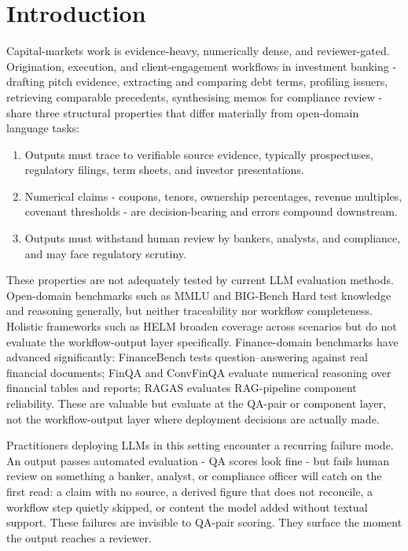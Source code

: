 \documentclass[11pt]{article}
\begin{document}
\section{Introduction}
\label{sec:intro}

Capital-markets work is evidence-heavy, numerically dense, and reviewer-gated. Origination, execution, and client-engagement workflows in investment banking - drafting pitch evidence, extracting and comparing debt terms, profiling issuers, retrieving comparable precedents, synthesising memos for compliance review - share three structural properties that differ materially from open-domain language tasks:

\begin{enumerate}[leftmargin=*,itemsep=0.2em]
\item Outputs must trace to verifiable source evidence, typically prospectuses, regulatory filings, term sheets, and investor presentations.
\item Numerical claims - coupons, tenors, ownership percentages, revenue multiples, covenant thresholds - are decision-bearing and errors compound downstream.
\item Outputs must withstand human review by bankers, analysts, and compliance, and may face regulatory scrutiny.
\end{enumerate}

These properties are not adequately tested by current LLM evaluation methods. Open-domain benchmarks such as MMLU \citep{hendrycks2021mmlu} and BIG-Bench Hard \citep{suzgun2022bbh} test knowledge and reasoning generally, but neither traceability nor workflow completeness. Holistic frameworks such as HELM \citep{liang2022helm} broaden coverage across scenarios but do not evaluate the workflow-output layer specifically. Finance-domain benchmarks have advanced significantly: FinanceBench \citep{islam2023financebench} tests question--answering against real financial documents; FinQA \citep{chen2021finqa} and ConvFinQA \citep{chen2022convfinqa} evaluate numerical reasoning over financial tables and reports; RAGAS \citep{es2023ragas} evaluates RAG-pipeline component reliability. These are valuable but evaluate at the QA-pair or component layer, not the workflow-output layer where deployment decisions are actually made.

Practitioners deploying LLMs in this setting encounter a recurring failure mode. An output passes automated evaluation - QA scores look fine - but fails human review on something a banker, analyst, or compliance officer will catch on the first read: a claim with no source, a derived figure that does not reconcile, a workflow step quietly skipped, or content the model added without textual support. These failures are invisible to QA-pair scoring. They surface the moment the output reaches a reviewer.
\end{document}
